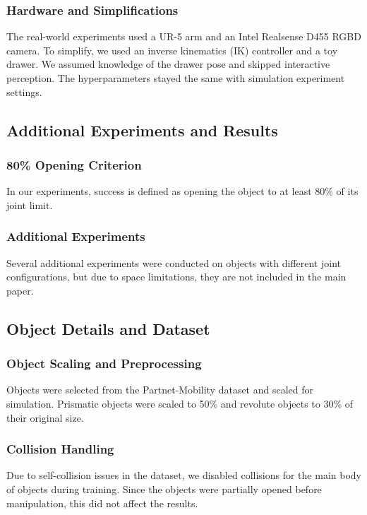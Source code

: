 \subsubsection{Hardware and Simplifications}
The real-world experiments used a UR-5 arm and an Intel Realsense D455 RGBD camera. To simplify, we used an inverse kinematics (IK) controller and a toy drawer. We assumed knowledge of the drawer pose and skipped interactive perception. The hyperparameters stayed the same with simulation experiment settings.
\subsection{Additional Experiments and Results}

\subsubsection{80\% Opening Criterion}
In our experiments, success is defined as opening the object to at least 80\% of its joint limit.

\subsubsection{Additional Experiments}
Several additional experiments were conducted on objects with different joint configurations, but due to space limitations, they are not included in the main paper.

\subsection{Object Details and Dataset}

\subsubsection{Object Scaling and Preprocessing}
Objects were selected from the Partnet-Mobility dataset and scaled for simulation. Prismatic objects were scaled to 50\% and revolute objects to 30\% of their original size.

\subsubsection{Collision Handling}
Due to self-collision issues in the dataset, we disabled collisions for the main body of objects during training. Since the objects were partially opened before manipulation, this did not affect the results.
